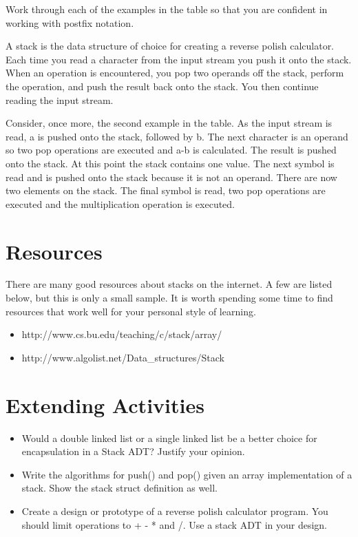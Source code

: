     Work through each of the examples in the table so that you are confident in working with postfix notation.

    A stack is the data structure of choice for creating a reverse polish calculator. Each time you read a character from the input stream you push
it onto the stack. When an operation is encountered, you pop two operands
off the stack, perform the operation, and push the result back onto the stack. You then continue reading the input stream.

    Consider, once more, the second example in the table. As the input stream
is read, a is pushed onto the stack, followed by b. The next character is
an operand so two pop operations are executed and a-b is calculated. The
result is pushed onto the stack. At this point the stack contains one
value. The next symbol is read and is pushed onto the stack because it is
not an operand. There are now two elements on the stack. The final symbol
is read, two pop operations are executed and the multiplication operation
is executed.



\section{Resources}
    There are many good resources about stacks on the internet. A few are listed below, but this is only a small sample.   It is worth spending some time to find resources that work well for your personal style of learning.

\begin{itemize}
	\item http://www.cs.bu.edu/teaching/c/stack/array/
	\item http://www.algolist.net/Data\_structures/Stack
\end{itemize}


\section{Extending Activities}

\begin{itemize}
\item Would a double linked list or a single linked list be a better choice for encapsulation in a Stack ADT?  Justify your opinion.

\item Write the algorithms for push() and pop() given an array implementation of a stack.  Show the stack struct definition as  well.

\item Create a design or prototype of a reverse polish calculator program.   You should limit operations to + - * and /.    Use a stack ADT in your design.

\end{itemize}

